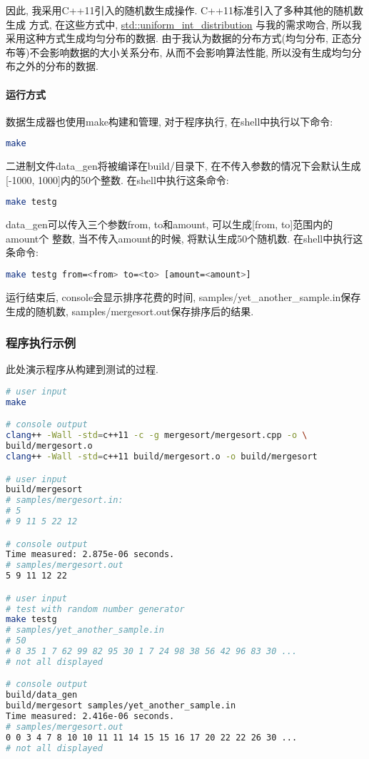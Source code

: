因此, 我采用C++11引入的随机数生成操作. C++11标准引入了多种其他的随机数生成
方式, 在这些方式中, \href{http://en.cppreference.com/w/cpp/numeric/random/uniform\_int\_distribution}
{std::uniform\_int\_distribution}
与我的需求吻合, 所以我采用这种方式生成均匀分布的数据.
由于我认为数据的分布方式(均匀分布, 正态分布等)不会影响数据的大小关系分布, 
从而不会影响算法性能, 所以没有生成均匀分布之外的分布的数据.
\paragraph{运行方式}
数据生成器也使用make构建和管理, 对于程序执行, 在shell中执行以下命令:
\begin{lstlisting}[language=bash]
make
\end{lstlisting}
二进制文件data_gen将被编译在build/目录下, 在不传入参数的情况下会默认生成
[-1000, 1000]内的50个整数. 在shell中执行这条命令:
\begin{lstlisting}[language=bash]
make testg
\end{lstlisting}
data_gen可以传入三个参数from, to和amount, 可以生成[from, to]范围内的amount个
整数, 当不传入amount的时候, 将默认生成50个随机数. 在shell中执行这条命令:
\begin{lstlisting}[language=bash]
make testg from=<from> to=<to> [amount=<amount>]
\end{lstlisting}
运行结束后, console会显示排序花费的时间, samples/yet_another_sample.in保存
生成的随机数, samples/mergesort.out保存排序后的结果.
\subsubsection{程序执行示例}
此处演示程序从构建到测试的过程.
\begin{lstlisting}[language=bash]
# user input
make

# console output
clang++ -Wall -std=c++11 -c -g mergesort/mergesort.cpp -o \
build/mergesort.o
clang++ -Wall -std=c++11 build/mergesort.o -o build/mergesort

# user input
build/mergesort
# samples/mergesort.in:
# 5
# 9 11 5 22 12

# console output
Time measured: 2.875e-06 seconds.
# samples/mergesort.out
5 9 11 12 22 

# user input
# test with random number generator
make testg
# samples/yet_another_sample.in
# 50
# 8 35 1 7 62 99 82 95 30 1 7 24 98 38 56 42 96 83 30 ...
# not all displayed

# console output
build/data_gen
build/mergesort samples/yet_another_sample.in
Time measured: 2.416e-06 seconds.
# samples/mergesort.out
0 0 3 4 7 8 10 10 11 11 14 15 15 16 17 20 22 22 26 30 ...
# not all displayed
\end{lstlisting}

